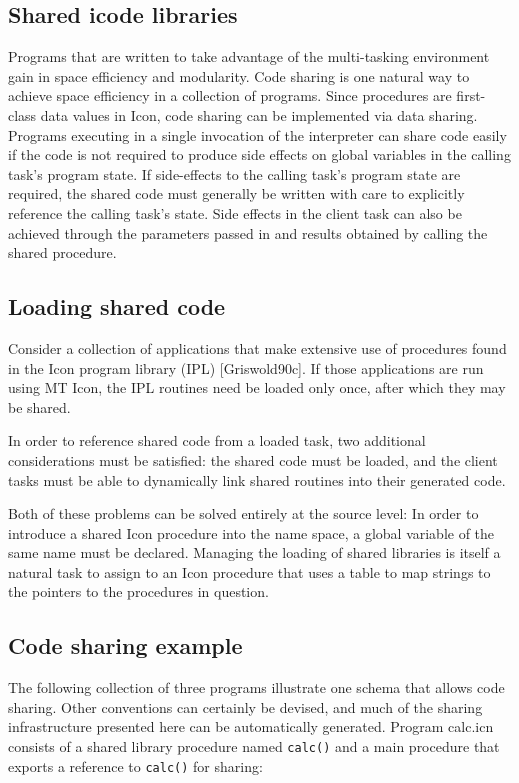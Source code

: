 \subsection*{Shared icode libraries}

Programs that are written to take advantage of the multi-tasking environment
gain in space efficiency and modularity. Code sharing is one natural way to
achieve space efficiency in a collection of programs. Since procedures are
first-class data values in Icon, code sharing can be implemented via data
sharing. Programs executing in a single invocation of the interpreter can share
code easily if the code is not required to produce side effects on global
variables in the calling task's program state. If side-effects to the calling
task's program state are required, the shared code must generally be written
with care to explicitly reference the calling task's state. Side effects in the
client task can also be achieved through the parameters passed in and results
obtained by calling the shared procedure.

\subsection*{Loading shared code}

Consider a collection of applications that make extensive use of
procedures found in the Icon program library (IPL) [Griswold90c]. If
those applications are run using MT Icon, the IPL routines need be
loaded only once, after which they may be shared.

In order to reference shared code from a loaded task, two additional
considerations must be satisfied: the shared code must be loaded, and
the client tasks must be able to dynamically link shared routines into
their generated code.

Both of these problems can be solved entirely at the source level: In
order to introduce a shared Icon procedure into the name space, a
global variable of the same name must be declared. Managing the
loading of shared libraries is itself a natural task to assign to an
Icon procedure that uses a table to map strings to the pointers to the
procedures in question.

\subsection*{Code sharing example}

The following collection of three programs illustrate one schema that allows
code sharing. Other conventions can certainly be devised, and much of the
sharing infrastructure presented here can be automatically generated. Program
calc.icn consists of a shared library procedure named {\texttt{calc()}} and a
main procedure that exports a reference to {\texttt{calc()}} for sharing:

